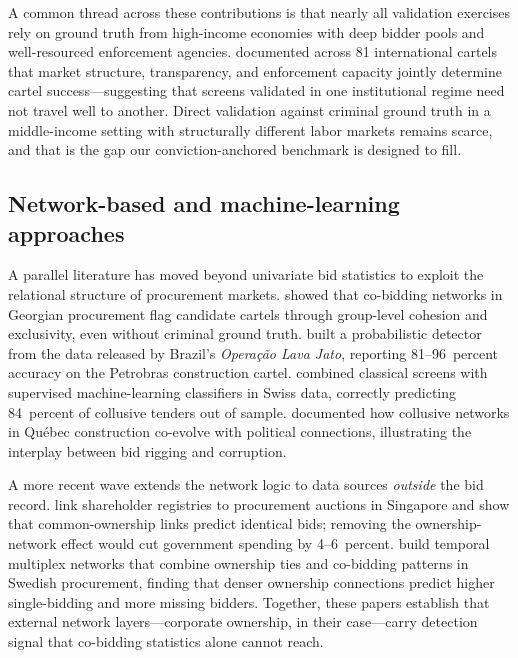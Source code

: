 A common thread across these contributions is that nearly all validation exercises rely on ground truth from high-income economies with deep bidder pools and well-resourced enforcement agencies. \citet{levenstein2006determines} documented across 81 international cartels that market structure, transparency, and enforcement capacity jointly determine cartel success---suggesting that screens validated in one institutional regime need not travel well to another. Direct validation against criminal ground truth in a middle-income setting with structurally different labor markets remains scarce, and that is the gap our conviction-anchored benchmark is designed to fill.

\subsection{Network-based and machine-learning approaches}

A parallel literature has moved beyond univariate bid statistics to exploit the relational structure of procurement markets. \citet{wachs2019network} showed that co-bidding networks in Georgian procurement flag candidate cartels through group-level cohesion and exclusivity, even without criminal ground truth. \citet{signor2020detection} built a probabilistic detector from the data released by Brazil's \emph{Operação Lava Jato}, reporting 81--96~percent accuracy on the Petrobras construction cartel. \citet{huber2019machine} combined classical screens with supervised machine-learning classifiers in Swiss data, correctly predicting 84~percent of collusive tenders out of sample. \citet{clark2018bid} documented how collusive networks in Québec construction co-evolve with political connections, illustrating the interplay between bid rigging and corruption.

A more recent wave extends the network logic to data sources \emph{outside} the bid record. \citet{asai2026ownership} link shareholder registries to procurement auctions in Singapore and show that common-ownership links predict identical bids; removing the ownership-network effect would cut government spending by 4--6~percent. \citet{villamil2024collusion} build temporal multiplex networks that combine ownership ties and co-bidding patterns in Swedish procurement, finding that denser ownership connections predict higher single-bidding and more missing bidders. Together, these papers establish that external network layers---corporate ownership, in their case---carry detection signal that co-bidding statistics alone cannot reach.

